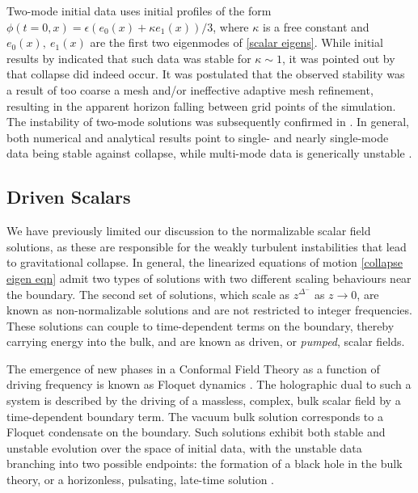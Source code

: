 \documentclass[../PhD.tex]{subfiles}
\begin{document}
Two-mode initial data uses initial profiles of the form $\phi(t=0,x) = \epsilon ( e_0 (x) + \kappa e_1 (x) )/3$, where $\kappa$ is a free constant and $e_0(x), \: e_1(x)$ are the first two eigenmodes of \eqref{scalar eigens}. While initial results by \cite{1403.6471} indicated that such data was stable for $\kappa \sim 1$, it was pointed out by \cite{1410.2631} that  collapse did indeed occur. It was postulated that the observed stability was a result of too coarse a mesh and/or ineffective adaptive mesh refinement, resulting in the apparent horizon falling between grid points of the simulation. The instability of two-mode solutions was subsequently confirmed in \cite{1508.02709}. In general, both numerical and analytical results point to single- and nearly single-mode data being stable against collapse, while multi-mode data is generically unstable \cite{1311.7409, 1211.7076, 1512.00349, 1509.00232, 1512.04383, 1504.05203, 1904.02168}.


\subsection{Driven Scalars}

We have previously limited our discussion to the normalizable scalar field solutions, as these are responsible for the weakly turbulent instabilities that lead to gravitational collapse. In general, the linearized equations of motion \eqref{collapse eigen eqn} admit two types of solutions with two different scaling behaviours near the boundary. The second set of solutions, which scale as $z^{\Delta^-}$ as $z \to 0$, are known as non-normalizable solutions and are not restricted to integer frequencies. These solutions can couple to time-dependent terms on the boundary, thereby carrying energy into the bulk, and are known as driven, or \emph{pumped}, scalar fields.

The emergence of new phases in a Conformal Field Theory as a function of driving frequency is known as Floquet dynamics \cite{1805.00031, 1802.05285}. The holographic dual to such a system is described by the driving of a massless, complex, bulk scalar field by a time-dependent boundary term. The vacuum bulk solution corresponds to a Floquet condensate on the boundary. Such solutions exhibit both stable and unstable evolution over the space of initial data, with the unstable data branching into two possible endpoints: the formation of a black hole in the bulk theory, or a horizonless, pulsating, late-time solution \cite{1712.07637}.
\end{document}
